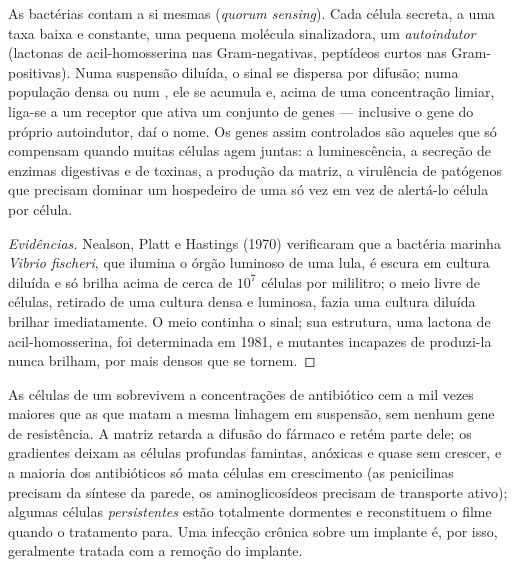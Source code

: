 \begin{proposition}\label{prop:b2:microbial-metabolism:quorum}
As bactérias contam a si mesmas (\textit{quorum sensing}). Cada célula secreta, a uma taxa baixa
e constante, uma pequena molécula sinalizadora, um
\emph{autoindutor} (lactonas de acil-homosserina nas Gram-negativas,
peptídeos curtos nas Gram-positivas). Numa suspensão diluída, o sinal
se dispersa por difusão; numa população densa ou num , ele se
acumula e, acima de uma concentração limiar, liga-se a um receptor que
ativa um conjunto de genes --- inclusive o gene do próprio autoindutor,
daí o nome. Os genes assim controlados são aqueles que só compensam
quando muitas células agem juntas: a luminescência, a secreção de
enzimas digestivas e de toxinas, a produção da matriz, a virulência de
patógenos que precisam dominar um hospedeiro de uma só vez em vez de
alertá-lo célula por célula.
\end{proposition}
\begin{proof}[Evidências]
Nealson, Platt e Hastings (1970) verificaram que a bactéria marinha
\emph{Vibrio fischeri}, que ilumina o órgão luminoso de uma lula, é
escura em cultura diluída e só brilha acima de cerca de $10^{7}$
células por mililitro; o meio livre de células, retirado de uma
cultura densa e luminosa, fazia uma cultura diluída brilhar
imediatamente. O meio continha o sinal; sua estrutura, uma lactona de
acil-homosserina, foi determinada em 1981, e mutantes incapazes de
produzi-la nunca brilham, por mais densos que se tornem.
\end{proof}

\begin{example}\label{ex:b2:microbial-metabolism:tolerance}
As células de um  sobrevivem a concentrações de antibiótico
cem a mil vezes maiores que as que matam a mesma linhagem em
suspensão, sem nenhum gene de resistência. A matriz retarda a difusão
do fármaco e retém parte dele; os gradientes deixam as células
profundas famintas, anóxicas e quase sem crescer, e a maioria dos
antibióticos só mata células em crescimento (as penicilinas precisam
da síntese da parede, os aminoglicosídeos precisam de transporte
ativo); algumas células \emph{persistentes} estão totalmente dormentes
e reconstituem o filme quando o tratamento para. Uma infecção crônica
sobre um implante é, por isso, geralmente tratada com a remoção do
implante.
\end{example}

